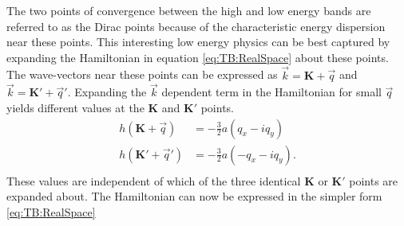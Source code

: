 The two points of convergence between the high and low energy bands are referred to as the Dirac points because of the characteristic energy dispersion near these points.
This interesting low energy physics can be best captured by expanding the Hamiltonian in equation \ref{eq:TB:RealSpace} about these points.
The wave-vectors near these points can be expressed as $\vec{k}=\bm{K}+\vec{q}$ and $\vec{k}=\bm{K'}+\vec{q}'$.
Expanding the $\vec{k}$ dependent term in the Hamiltonian for small $\vec{q}$ yields different values at the $\bm{K}$ and $\bm{K'}$ points.
\begin{align*}
	h(\bm{K }+\vec{q})&= -\frac{3}{2} a \left( q_x-i q_y \right) \\
	h(\bm{K'}+\vec{q}')&= -\frac{3}{2} a \left(-q_x-i q_y \right) . \\
\end{align*}
These values are independent of which of the three identical $\bm{K}$ or $\bm{K'}$ points are expanded about.
The Hamiltonian can now be expressed in the simpler form \ref{eq:TB:RealSpace}
